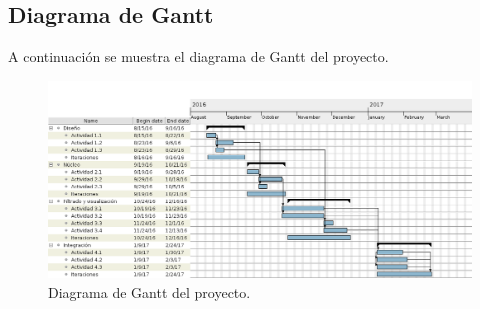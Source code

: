 \subsection*{Diagrama de Gantt}

A continuación se muestra el diagrama de Gantt del proyecto.

\begin{figure}[htbp!]
	\includegraphics[scale=.35]{gantt_png}
	\caption{Diagrama de Gantt del proyecto.}
	\label{fig:gantt}
\end{figure}